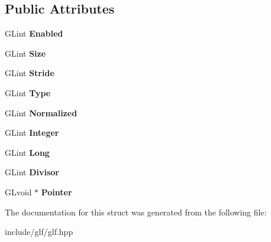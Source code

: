 \subsection*{Public Attributes}
\begin{DoxyCompactItemize}
\item 
\hypertarget{structglf_1_1vertexattrib_ae6e0dd40ba6863f15c64313da4862edc}{G\-Lint {\bfseries Enabled}}\label{structglf_1_1vertexattrib_ae6e0dd40ba6863f15c64313da4862edc}

\item 
\hypertarget{structglf_1_1vertexattrib_a4b74c71d833118e6c80d417530bf9fc8}{G\-Lint {\bfseries Size}}\label{structglf_1_1vertexattrib_a4b74c71d833118e6c80d417530bf9fc8}

\item 
\hypertarget{structglf_1_1vertexattrib_aaec7ebcc678893cd4d058517640e1e63}{G\-Lint {\bfseries Stride}}\label{structglf_1_1vertexattrib_aaec7ebcc678893cd4d058517640e1e63}

\item 
\hypertarget{structglf_1_1vertexattrib_a270f5d6939dbd95300771c3566e24aba}{G\-Lint {\bfseries Type}}\label{structglf_1_1vertexattrib_a270f5d6939dbd95300771c3566e24aba}

\item 
\hypertarget{structglf_1_1vertexattrib_ad10dafa0d8a532b1e37b84f24998ae73}{G\-Lint {\bfseries Normalized}}\label{structglf_1_1vertexattrib_ad10dafa0d8a532b1e37b84f24998ae73}

\item 
\hypertarget{structglf_1_1vertexattrib_a8bf4c5bfba445f79bf1e634e1cf294af}{G\-Lint {\bfseries Integer}}\label{structglf_1_1vertexattrib_a8bf4c5bfba445f79bf1e634e1cf294af}

\item 
\hypertarget{structglf_1_1vertexattrib_a5671c11c2ec68ce1e5b1408feca13bd4}{G\-Lint {\bfseries Long}}\label{structglf_1_1vertexattrib_a5671c11c2ec68ce1e5b1408feca13bd4}

\item 
\hypertarget{structglf_1_1vertexattrib_aeef2520b2a425875497365eb077e9bf2}{G\-Lint {\bfseries Divisor}}\label{structglf_1_1vertexattrib_aeef2520b2a425875497365eb077e9bf2}

\item 
\hypertarget{structglf_1_1vertexattrib_a7176c5624933a1ac0a7a2390e1d22e82}{G\-Lvoid $\ast$ {\bfseries Pointer}}\label{structglf_1_1vertexattrib_a7176c5624933a1ac0a7a2390e1d22e82}

\end{DoxyCompactItemize}


The documentation for this struct was generated from the following file\-:\begin{DoxyCompactItemize}
\item 
include/glf/glf.\-hpp\end{DoxyCompactItemize}
